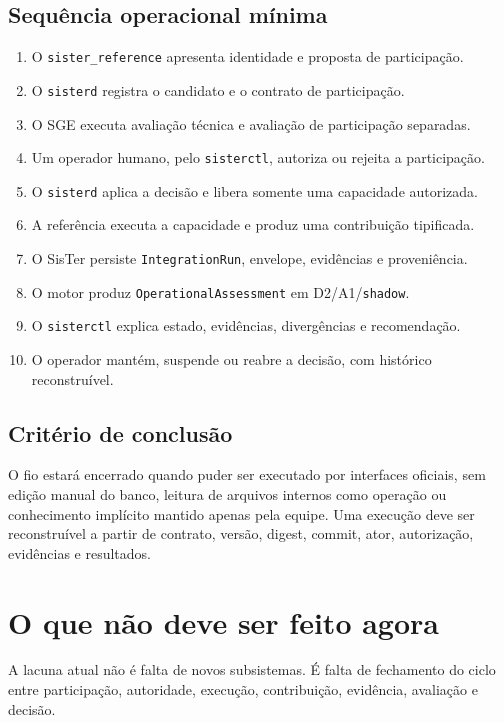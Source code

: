 \documentclass[11pt,a4paper,oneside]{article}
\begin{document}
\subsection{Sequência operacional mínima}

\begin{enumerate}
  \item O \texttt{sister\_reference} apresenta identidade e proposta de participação.
  \item O \texttt{sisterd} registra o candidato e o contrato de participação.
  \item O SGE executa avaliação técnica e avaliação de participação separadas.
  \item Um operador humano, pelo \texttt{sisterctl}, autoriza ou rejeita a participação.
  \item O \texttt{sisterd} aplica a decisão e libera somente uma capacidade autorizada.
  \item A referência executa a capacidade e produz uma contribuição tipificada.
  \item O SisTer persiste \texttt{IntegrationRun}, envelope, evidências e proveniência.
  \item O motor produz \texttt{OperationalAssessment} em D2/A1/\texttt{shadow}.
  \item O \texttt{sisterctl} explica estado, evidências, divergências e recomendação.
  \item O operador mantém, suspende ou reabre a decisão, com histórico reconstruível.
\end{enumerate}

\subsection{Critério de conclusão}

O fio estará encerrado quando puder ser executado por interfaces oficiais, sem edição manual do banco, leitura de arquivos internos como operação ou conhecimento implícito mantido apenas pela equipe. Uma execução deve ser reconstruível a partir de contrato, versão, digest, commit, ator, autorização, evidências e resultados.

\section{O que não deve ser feito agora}

\begin{alerta}
A lacuna atual não é falta de novos subsistemas. É falta de fechamento do ciclo entre participação, autoridade, execução, contribuição, evidência, avaliação e decisão.
\end{alerta}
\end{document}
